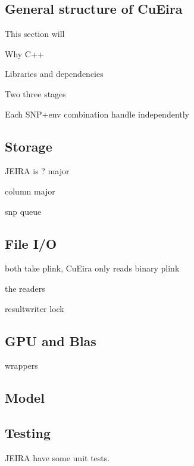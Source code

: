 \documentclass[10pt,a4paper]{report}
\begin{document}
\subsection{General structure of CuEira}
This section will

Why C++

Libraries and dependencies

Two three stages

Each SNP+env combination handle independently

\subsection{Storage}
JEIRA is ? major

column major

snp queue






\subsection{File I/O}
both take plink, CuEira only reads binary plink

the readers

resultwriter
lock

\subsection{GPU and Blas}
wrappers

\subsection{Model}

\subsection{Testing}
JEIRA have some unit tests.
\end{document}
